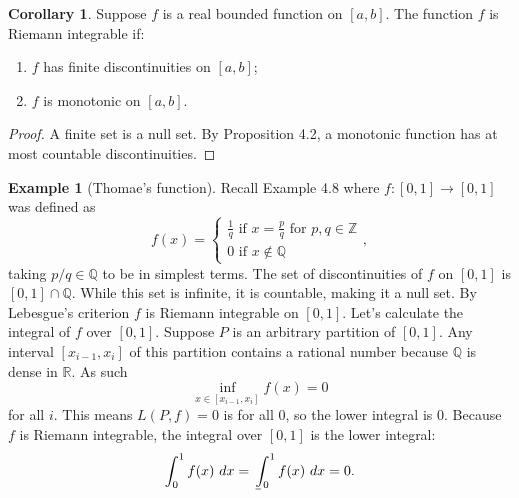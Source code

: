 \documentclass{article}
\def\lowint{\mkern3mu\underline{\vphantom{\intop}\mkern7mu}\mkern-10mu\int}
\newcommand{\R}{\mathbb{R}}
\newcommand{\Q}{\mathbb{Q}}
\newcommand{\Z}{\mathbb{Z}}
\theoremstyle{definition}
\newtheorem{corollary}{Corollary}[section]
\newtheorem{example}{Example}[section]
\begin{document}
	\begin{corollary}
		Suppose $ f $ is a real bounded  function on $ [a,b] $. The function $ f $ is Riemann integrable if:
		\begin{enumerate}
			\item $ f $ has finite discontinuities on $ [a,b] $;
			\item $ f $ is monotonic on $ [a,b] $.
		\end{enumerate}
	\end{corollary}
	\begin{proof}
		A finite set is a null set. By Proposition 4.2, a monotonic function has at most countable discontinuities. 
		\end{proof}
	\begin{example}[Thomae's function]
		Recall Example 4.8 where $ f:[0,1]\to[0,1] $ was defined as $$f(x)=\begin{cases}
			\frac{1}{q} \text{ if }x=\frac{p}{q}\text{ for }p,q\in\Z\\
			0\text{ if }x\notin\Q
		\end{cases} ,$$ taking $ p/q\in\Q $ to be in simplest terms. The set of discontinuities of $ f $ on $ [0,1] $ is $ [0,1]\cap\Q $. While this set is infinite, it is countable, making it a null set. By Lebesgue's criterion $ f $ is Riemann integrable on $ [0,1] $. Let's calculate the integral of $ f $ over $ [0,1] $. Suppose $ P $ is an arbitrary partition of $ [0,1] $. Any interval $ [x_{i-1},x_i] $ of this partition contains a rational number because $ \Q $ is dense in $ \R $. As such $$ \inf_{x\in[x_{i-1}, x_i]}f(x) = 0$$ for all $ i $. This means $ L(P,f) = 0 $ is for all $ 0 $, so the lower integral is $ 0 $. Because $ f $ is Riemann integrable, the integral over $ [0,1] $ is the lower integral: 
	$$\int_0^1 f(x) \ dx = \lowint_{0}^1 f(x)\ dx = 0 .$$
	\end{example}
\end{document}

